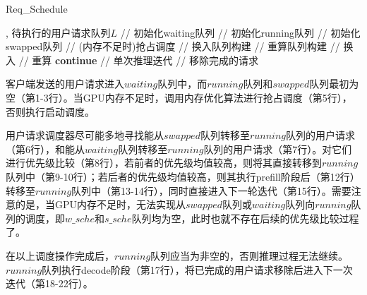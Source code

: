 \begin{algorithm}
  \caption{Req\_Schedule}
  \label{Code:用户请求调度器工作流程}
  \small
  \begin{spacing}{1.2}
    \begin{algorithmic}[1]
      , {待执行的用户请求队列$L$}
        \hfill {// 初始化waiting队列}
       \hfill {// 初始化running队列}
       \hfill {// 初始化swapped队列}
          \hfill {// (内存不足时)抢占调度}
          \hfill {// 换入队列构建}
          \hfill {// 重算队列构建}
            \hfill {// 换入}
        \ELSE
            \hfill {// 重算}
          \STATE \textbf{continue}
        \ENDIF
         \hfill {// 单次推理迭代}
             \hfill {// 移除完成的请求}
          \ENDIF
        \ENDFOR
      \ENDWHILE
    \end{algorithmic}
  \end{spacing}
\end{algorithm}

客户端发送的用户请求进入$waiting$队列中，而$running$队列和$swapped$队列最初为空（第1-3行）。当GPU内存不足时，调用内存优化算法进行抢占调度（第5行），否则执行启动调度。 \par

用户请求调度器尽可能多地寻找能从$swapped$队列转移至$running$队列的用户请求（第6行），和能从$waiting$队列转移至$running$队列的用户请求（第7行）。对它们进行优先级比较（第8行），若前者的优先级均值较高，则将其直接转移到$running$队列中（第9-10行）；若后者的优先级均值较高，则其执行prefill阶段后（第12行）转移至$running$队列中（第13-14行），同时直接进入下一轮迭代（第15行）。需要注意的是，当GPU内存不足时，无法实现从$swapped$队列或$waiting$队列向$running$队列的调度，即$w\_sche$和$s\_sche$队列均为空，此时也就不存在后续的优先级比较过程了。 \par

在以上调度操作完成后，$running$队列应当为非空的，否则推理过程无法继续。$running$队列执行decode阶段（第17行），将已完成的用户请求移除后进入下一次迭代（第18-22行）。 \par

